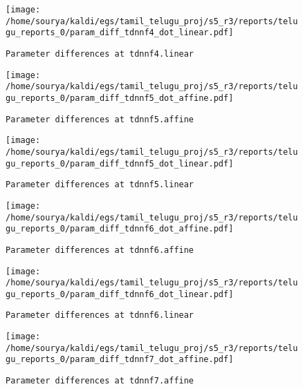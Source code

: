 \documentclass[prl,10pt,twocolumn]{revtex4}
\begin{document}
\newpage
\begin{figure}[h]
  \begin{center}
    \caption{\texttt{Parameter differences at tdnnf4.linear}}
    \texttt{[image: /home/sourya/kaldi/egs/tamil\_telugu\_proj/s5\_r3/reports/telugu\_reports\_0/param\_diff\_tdnnf4\_dot\_linear.pdf]}
  \end{center}
\end{figure}
\clearpage


\newpage
\begin{figure}[h]
  \begin{center}
    \caption{\texttt{Parameter differences at tdnnf5.affine}}
    \texttt{[image: /home/sourya/kaldi/egs/tamil\_telugu\_proj/s5\_r3/reports/telugu\_reports\_0/param\_diff\_tdnnf5\_dot\_affine.pdf]}
  \end{center}
\end{figure}
\clearpage


\newpage
\begin{figure}[h]
  \begin{center}
    \caption{\texttt{Parameter differences at tdnnf5.linear}}
    \texttt{[image: /home/sourya/kaldi/egs/tamil\_telugu\_proj/s5\_r3/reports/telugu\_reports\_0/param\_diff\_tdnnf5\_dot\_linear.pdf]}
  \end{center}
\end{figure}
\clearpage


\newpage
\begin{figure}[h]
  \begin{center}
    \caption{\texttt{Parameter differences at tdnnf6.affine}}
    \texttt{[image: /home/sourya/kaldi/egs/tamil\_telugu\_proj/s5\_r3/reports/telugu\_reports\_0/param\_diff\_tdnnf6\_dot\_affine.pdf]}
  \end{center}
\end{figure}
\clearpage


\newpage
\begin{figure}[h]
  \begin{center}
    \caption{\texttt{Parameter differences at tdnnf6.linear}}
    \texttt{[image: /home/sourya/kaldi/egs/tamil\_telugu\_proj/s5\_r3/reports/telugu\_reports\_0/param\_diff\_tdnnf6\_dot\_linear.pdf]}
  \end{center}
\end{figure}
\clearpage


\newpage
\begin{figure}[h]
  \begin{center}
    \caption{\texttt{Parameter differences at tdnnf7.affine}}
    \texttt{[image: /home/sourya/kaldi/egs/tamil\_telugu\_proj/s5\_r3/reports/telugu\_reports\_0/param\_diff\_tdnnf7\_dot\_affine.pdf]}
  \end{center}
\end{figure}
\clearpage
\end{document}
